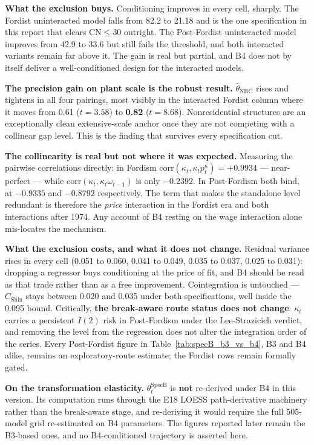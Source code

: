 \documentclass[11pt,a4paper]{article}
\begin{document}
\textbf{What the exclusion buys.} Conditioning improves in every cell, sharply. The Fordist uninteracted model falls from 82.2 to 21.18 and is the one specification in this report that clears $\text{CN} \le 30$ outright. The Post-Fordist uninteracted model improves from 42.9 to 33.6 but still fails the threshold, and both interacted variants remain far above it. The gain is real but partial, and B4 does not by itself deliver a well-conditioned design for the interacted models.

\textbf{The precision gain on plant scale is the robust result.} $\hat{\theta}_{\text{NRC}}$ rises and tightens in all four pairings, most visibly in the interacted Fordist column where it moves from 0.61 ($t = 3.58$) to \textbf{0.82} ($t = 8.68$). Nonresidential structures are an exceptionally clean extensive-scale anchor once they are not competing with a collinear gap level. This is the finding that survives every specification cut.

\textbf{The collinearity is real but not where it was expected.} Measuring the pairwise correlations directly: in Fordism $\text{corr}(\kappa_t, \kappa_t p_t^{\kappa}) = +0.9934$ --- near-perfect --- while $\text{corr}(\kappa_t, \kappa_t \omega_{t-1})$ is only $-0.2392$. In Post-Fordism both bind, at $-0.9335$ and $-0.8792$ respectively. The term that makes the standalone level redundant is therefore the \textit{price} interaction in the Fordist era and both interactions after 1974. Any account of B4 resting on the wage interaction alone mis-locates the mechanism.

\textbf{What the exclusion costs, and what it does not change.} Residual variance rises in every cell (0.051 to 0.060, 0.041 to 0.049, 0.035 to 0.037, 0.025 to 0.031): dropping a regressor buys conditioning at the price of fit, and B4 should be read as that trade rather than as a free improvement. Cointegration is untouched --- $C_{\text{Shin}}$ stays between 0.020 and 0.035 under both specifications, well inside the 0.095 bound. Critically, \textbf{the break-aware route status does not change}: $\kappa_t$ carries a persistent $I(2)$ risk in Post-Fordism under the Lee-Strazicich verdict, and removing the level from the regression does not alter the integration order of the series. Every Post-Fordist figure in Table~\ref{tab:specB_b3_vs_b4}, B3 and B4 alike, remains an exploratory-route estimate; the Fordist rows remain formally gated.

\textbf{On the transformation elasticity.} $\theta_t^{\text{SpecB}}$ is \textbf{not} re-derived under B4 in this version. Its computation runs through the E18 LOESS path-derivative machinery rather than the break-aware stage, and re-deriving it would require the full 505-model grid re-estimated on B4 parameters. The figures reported later remain the B3-based ones, and no B4-conditioned trajectory is asserted here.
\end{document}

